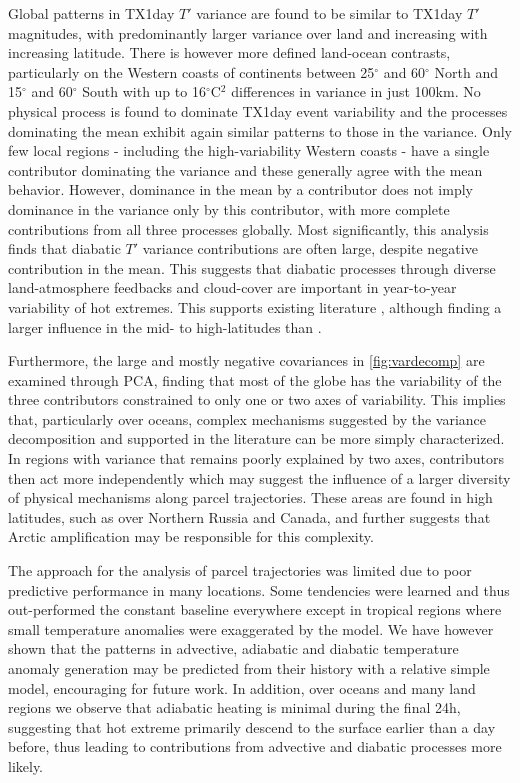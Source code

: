 \documentclass[11pt,a4paper,twoside,openright]{report}
\theoremstyle{definition}
\begin{document}
Global patterns in TX1day \(T'\) variance are found to be similar to TX1day \(T'\) magnitudes, with predominantly larger variance over land and increasing with increasing latitude. There is however more defined land-ocean contrasts, particularly on the Western coasts of continents between 25\(^\circ\) and 60\(^{\circ}\) North and 15\(^\circ\) and 60\(^\circ\) South with up to 16\(^\circ\)C\(^2\) differences in variance in just 100km. No physical process is found to dominate TX1day event variability and the processes dominating the mean exhibit again similar patterns to those in the variance. Only few local regions - including the high-variability Western coasts - have a single contributor dominating the variance and these generally agree with the mean behavior. However, dominance in the mean by a contributor does not imply dominance in the variance only by this contributor, with more complete contributions from all three processes globally. Most significantly, this analysis finds that diabatic \(T'\) variance contributions are often large, despite negative contribution in the mean. This suggests that diabatic processes through diverse land-atmosphere feedbacks and cloud-cover are important in year-to-year variability of hot extremes. This supports existing literature \citep{wehrli_identifying_2019,miralles_mega-heatwave_2014,schumacher_amplification_2019}, although finding a larger influence in the mid- to high-latitudes than \cite{wehrli_extremex_2022}.

Furthermore, the large and mostly negative covariances in \ref{fig:vardecomp} are examined through PCA, finding that most of the globe has the variability of the three contributors constrained to only one or two axes of variability. This implies that, particularly over oceans, complex mechanisms suggested by the variance decomposition and supported in the literature can be more simply characterized. In regions with variance that remains poorly explained by two axes, contributors then act more independently which may suggest the influence of a larger diversity of physical mechanisms along parcel trajectories. These areas are found in high latitudes, such as over Northern Russia and Canada, and further suggests that Arctic amplification \citep{cohen_recent_2014} may be responsible for this complexity.

The approach for the analysis of parcel trajectories was limited due to poor predictive performance in many locations. Some tendencies were learned and thus out-performed the constant baseline everywhere except in tropical regions where small temperature anomalies were exaggerated by the model. We have however shown that the patterns in advective, adiabatic and diabatic temperature anomaly generation may be predicted from their history with a relative simple model, encouraging for future work. In addition, over oceans and many land regions we observe that adiabatic heating is minimal during the final 24h, suggesting that hot extreme primarily descend to the surface earlier than a day before, thus leading to contributions from advective and diabatic processes more likely.
\end{document}
